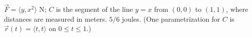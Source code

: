 {$\vec F = \langle y,x^2\rangle$ N; $C$ is the segment of the line $y=x$ from $(0,0)$ to $(1,1)$, where distances are measured in meters.
}
{$5/6$ joules. (One parametrization for $C$ is $\vec r(t) = \langle t,t\rangle$ on $0\leq t\leq 1$.)
}
